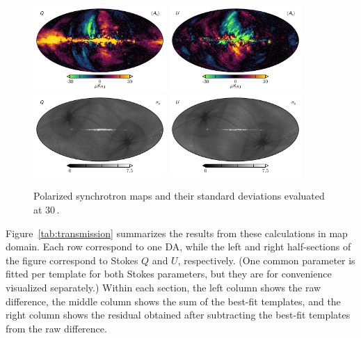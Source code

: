 \documentclass[twocolumn]{../../common/aa}
\begin{document}
\begin{figure}
	\centering
	\includegraphics[width=0.45\textwidth]{figures/synch_Q.pdf}
	\includegraphics[width=0.45\textwidth]{figures/synch_U.pdf}\\
	\includegraphics[width=0.45\textwidth]{figures/synch_Q_std.pdf}
	\includegraphics[width=0.45\textwidth]{figures/synch_U_std.pdf}\\
	\caption{Polarized synchrotron maps and their standard deviations evaluated at 30\,\GHz.}\label{fig:polarized_foregrounds}
\end{figure}

Figure~\ref{tab:transmission} summarizes the results from these calculations in map domain. Each row correspond to one DA, while the left and right half-sections of the figure correspond to Stokes $Q$ and $U$, respectively. (One common parameter is fitted per template for both Stokes parameters, but they are for convenience visualized separately.) Within each section, the left column shows the raw difference, the middle column shows the sum of the best-fit templates, and the right column shows the residual obtained after subtracting the best-fit templates from the raw difference.
\end{document}
